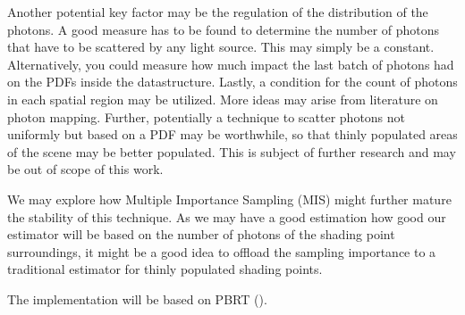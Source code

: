 Another potential key factor may be the regulation of the distribution of the photons. A good measure has to be found to determine the number of photons that have to be scattered by any light source. This may simply be a constant. Alternatively, you could measure how much impact the last batch of photons had on the PDFs inside the datastructure. Lastly, a condition for the count of photons in each spatial region may be utilized. More ideas may arise from literature on photon mapping. Further, potentially a technique to scatter photons not uniformly but based on a PDF may be worthwhile, so that thinly populated areas of the scene may be better populated. This is subject of further research and may be out of scope of this work.

We may explore how Multiple Importance Sampling (MIS) might further mature the stability of this technique. As we may have a good estimation how good our estimator will be based on the number of photons of the shading point surroundings, it might be a good idea to offload the sampling importance to a traditional estimator for thinly populated shading points.

The implementation will be based on PBRT (\cite{pbrt}).

